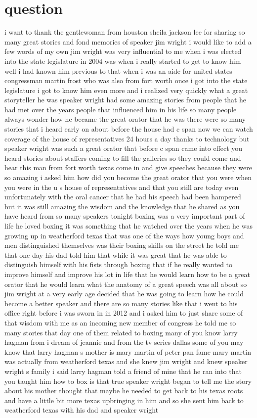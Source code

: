 \documentclass{article}
\begin{document}
\section*{question}
i want to thank the gentlewoman from houston sheila jackson lee for sharing so many great stories and fond memories of speaker jim wright i would like to add a few words of my own jim wright was very influential to me when i was elected into the state legislature in 2004 was when i really started to get to know him well i had known him previous to that when i was an aide for united states congressman martin frost who was also from fort worth once i got into the state legislature i got to know him even more and i realized very quickly what a great storyteller he was speaker wright had some amazing stories from people that he had met over the years people that influenced him in his life so many people always wonder how he became the great orator that he was there were so many stories that i heard early on about before the house had c span now we can watch coverage of the house of representatives 24 hours a day thanks to technology but speaker wright was such a great orator that before c span came into effect you heard stories about staffers coming to fill the galleries so they could come and hear this man from fort worth texas come in and give speeches because they were so amazing i asked him how did you become the great orator that you were when you were in the u s house of representatives and that you still are today even unfortunately with the oral cancer that he had his speech had been hampered but it was still amazing the wisdom and the knowledge that he shared as you have heard from so many speakers tonight boxing was a very important part of life he loved boxing it was something that he watched over the years when he was growing up in weatherford texas that was one of the ways how young boys and men distinguished themselves was their boxing skills on the street he told me that one day his dad told him that while it was great that he was able to distinguish himself with his fists through boxing that if he really wanted to improve himself and improve his lot in life that he would learn how to be a great orator that he would learn what the anatomy of a great speech was all about so jim wright at a very early age decided that he was going to learn how he could become a better speaker and there are so many stories like that i went to his office right before i was sworn in in 2012 and i asked him to just share some of that wisdom with me as an incoming new member of congress he told me so many stories that day one of them related to boxing many of you know larry hagman from i dream of jeannie and from the tv series dallas some of you may know that larry hagman s mother is mary martin of peter pan fame mary martin was actually from weatherford texas and she knew jim wright and knew speaker wright s family i said larry hagman told a friend of mine that he ran into that you taught him how to box is that true speaker wright began to tell me the story about his mother thought that maybe he needed to get back to his texas roots and have a little bit more texas upbringing in him and so she sent him back to weatherford texas with his dad and speaker wright 
\end{document}
